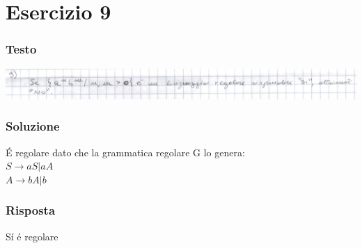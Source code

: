 \chapter{Esercizio 9}

\subsection{Testo}

\begin{center}
    \includegraphics[scale=0.2]{Chapters/Img/09text.png}\\
\end{center} 

\subsection{Soluzione}
\'E regolare dato che la grammatica regolare G lo genera:\\
$S \rightarrow aS | aA $\\
$A \rightarrow bA | b $\\


\subsection{Risposta}
S\'i \'e regolare